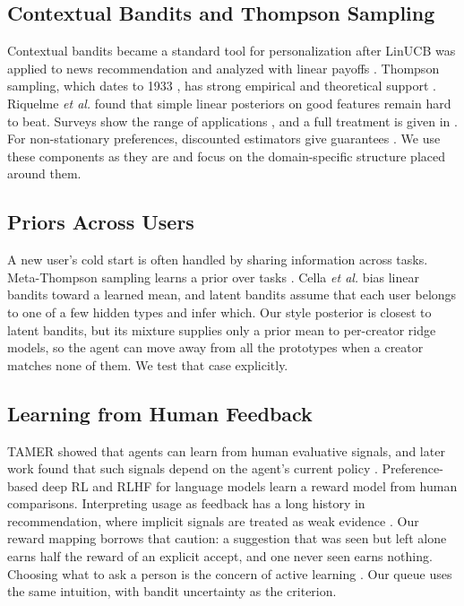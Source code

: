 \documentclass{ieeeaccess}
\begin{document}
\subsection{Contextual Bandits and Thompson Sampling}
Contextual bandits became a standard tool for personalization after LinUCB was applied to news recommendation \cite{li2010} and analyzed with linear payoffs \cite{chu2011}. Thompson sampling, which dates to 1933 \cite{thompson1933}, has strong empirical and theoretical support \cite{kaufmann2012,agrawal2013,abeille2017,russo2018}. Riquelme \emph{et al.} \cite{riquelme2018} found that simple linear posteriors on good features remain hard to beat. Surveys show the range of applications \cite{bouneffouf2020}, and a full treatment is given in \cite{lattimore2020}. For non-stationary preferences, discounted estimators give guarantees \cite{russac2019}. We use these components as they are and focus on the domain-specific structure placed around them.

\subsection{Priors Across Users}
A new user's cold start is often handled by sharing information across tasks. Meta-Thompson sampling learns a prior over tasks \cite{kveton2021meta}. Cella \emph{et al.} \cite{cella2020meta} bias linear bandits toward a learned mean, and latent bandits \cite{hong2020latent} assume that each user belongs to one of a few hidden types and infer which. Our style posterior is closest to latent bandits, but its mixture supplies only a prior mean to per-creator ridge models, so the agent can move away from all the prototypes when a creator matches none of them. We test that case explicitly.

\subsection{Learning from Human Feedback}
TAMER \cite{knox2009} showed that agents can learn from human evaluative signals, and later work found that such signals depend on the agent's current policy \cite{macglashan2017}. Preference-based deep RL \cite{christiano2017} and RLHF for language models \cite{ouyang2022} learn a reward model from human comparisons. Interpreting usage as feedback has a long history in recommendation, where implicit signals are treated as weak evidence \cite{hu2008}. Our reward mapping borrows that caution: a suggestion that was seen but left alone earns half the reward of an explicit accept, and one never seen earns nothing. Choosing what to ask a person is the concern of active learning \cite{settles2012}. Our queue uses the same intuition, with bandit uncertainty as the criterion.
\end{document}
